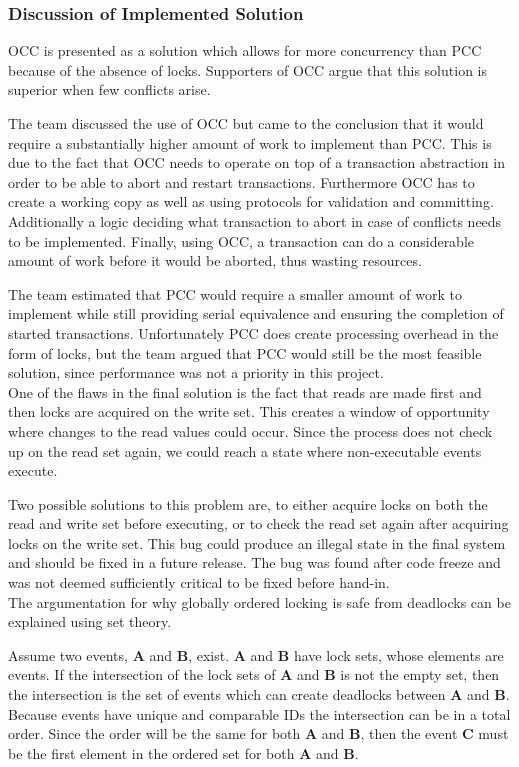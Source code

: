 \subsubsection{Discussion of Implemented Solution}
OCC is presented as a solution which allows for more concurrency than PCC because of the absence of locks. Supporters of OCC argue that this solution is superior when few conflicts arise. 

The team discussed the use of OCC but came to the conclusion that it would require a substantially higher amount of work to implement than PCC. This is due to the fact that OCC needs to operate on top of a transaction abstraction in order to be able to abort and restart transactions. Furthermore OCC has to create a working copy as well as using protocols for validation and committing. Additionally a logic deciding what transaction to abort in case of conflicts needs to be implemented. Finally, using OCC, a transaction can do a considerable amount of work before it would be aborted, thus wasting resources.

The team estimated that PCC would require a smaller amount of work to implement while still providing serial equivalence and ensuring the completion of started transactions. Unfortunately PCC does create processing overhead in the form of locks, but the team argued that PCC would still be the most feasible solution, since performance was not a priority in this project.\\

One of the flaws in the final solution is the fact that reads are made first and then locks are acquired on the write set. This creates a window of opportunity where changes to the read values could occur. Since the process does not check up on the read set again, we could reach a state where non-executable events execute. 

Two possible solutions to this problem are, to either acquire locks on both the read and write set before executing, or to check the read set again after acquiring locks on the write set. This bug could produce an illegal state in the final system and should be fixed in a future release. The bug was found after code freeze and was not deemed sufficiently critical to be fixed before hand-in.\\

The argumentation for why globally ordered locking is safe from deadlocks can be explained using set theory.

Assume two events, \textbf{A} and \textbf{B}, exist. \textbf{A} and \textbf{B} have lock sets, whose elements are events. If the intersection of the lock sets of \textbf{A} and \textbf{B} is not the empty set, then the intersection is the set of events which can create deadlocks between \textbf{A} and \textbf{B}. Because events have unique and comparable IDs the intersection can be in a total order. Since the order will be the same for both \textbf{A} and \textbf{B}, then the event \textbf{C} must be the first element in the ordered set for both \textbf{A} and \textbf{B}.

